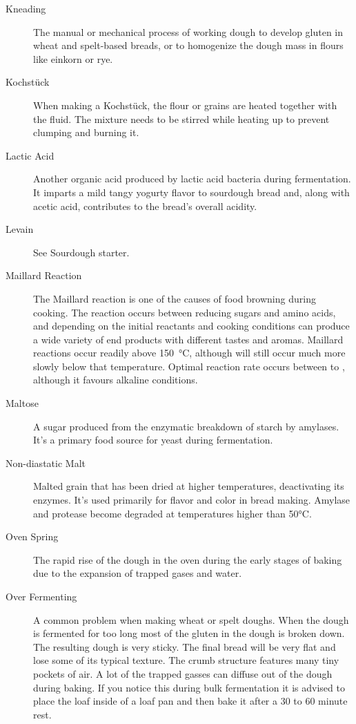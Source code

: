 \begin{description}
\item[Kneading] The manual or mechanical process of working dough to develop gluten
in wheat and spelt-based breads, or to homogenize the dough mass in flours like
einkorn or rye.

\item[Kochstück] When making a Kochstück, the flour or grains are heated
together with the fluid. The mixture needs to be stirred while heating up
to prevent clumping and burning it.

\item[Lactic Acid] Another organic acid produced by lactic acid bacteria during
fermentation. It imparts a mild tangy yogurty flavor to sourdough bread and, along
with acetic acid, contributes to the bread's overall acidity.

\item[Levain] See Sourdough starter.

\item[Maillard Reaction] The Maillard reaction is one of the causes of food browning
during cooking. The reaction occurs between reducing sugars and amino acids, and
depending on the initial reactants and cooking conditions can produce a wide variety
of end products with different tastes and aromas. Maillard reactions occur readily
above \SI{150}{\celsius}, although will still occur much more slowly below that
temperature. Optimal reaction rate occurs between  to ,
although it favours alkaline conditions.

\item[Maltose] A sugar produced from the enzymatic breakdown of starch by amylases.
It's a primary food source for yeast during fermentation.

\item[Non-diastatic Malt] Malted grain that has been dried at higher temperatures,
deactivating its enzymes. It's used primarily for flavor and color in bread making.
Amylase and protease become degraded at temperatures higher than 50°C.

\item[Oven Spring] The rapid rise of the dough in the oven during the early stages
of baking due to the expansion of trapped gases and water.

\item[Over Fermenting] A common problem when making wheat or spelt doughs. When the
dough is fermented for too long most of the gluten in the dough is broken down. The
resulting dough is very sticky. The final bread will be very flat and lose some of its
typical texture. The crumb structure features many tiny pockets of air. A lot of the
trapped gasses can diffuse out of the dough during baking. If you notice this during
bulk fermentation it is advised to place the loaf inside of a loaf pan and then bake
it after a 30 to 60 minute rest.


\end{description}
